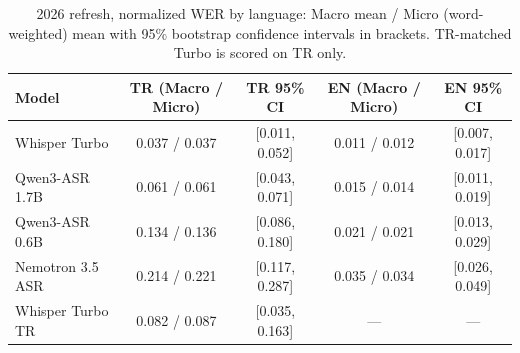 \begin{table}[t]
\caption{2026 refresh, normalized WER by language: Macro mean / Micro (word-weighted) mean with 95\% bootstrap confidence intervals in brackets. TR-matched Turbo is scored on TR only.}
\label{tab:asr-2026}
\centering
\renewcommand{\arraystretch}{1.15}
\setlength{\tabcolsep}{3.0pt}
\begin{tabular}{lcccc}
\toprule
\textbf{Model} & \textbf{TR (Macro / Micro)} & \textbf{TR 95\% CI} & \textbf{EN (Macro / Micro)} & \textbf{EN 95\% CI} \\
\midrule
Whisper Turbo & 0.037 / 0.037 & [0.011, 0.052] & 0.011 / 0.012 & [0.007, 0.017] \\
Qwen3-ASR 1.7B & 0.061 / 0.061 & [0.043, 0.071] & 0.015 / 0.014 & [0.011, 0.019] \\
Qwen3-ASR 0.6B & 0.134 / 0.136 & [0.086, 0.180] & 0.021 / 0.021 & [0.013, 0.029] \\
Nemotron 3.5 ASR & 0.214 / 0.221 & [0.117, 0.287] & 0.035 / 0.034 & [0.026, 0.049] \\
Whisper Turbo TR & 0.082 / 0.087 & [0.035, 0.163] & --- & --- \\
\bottomrule
\end{tabular}
\end{table}
